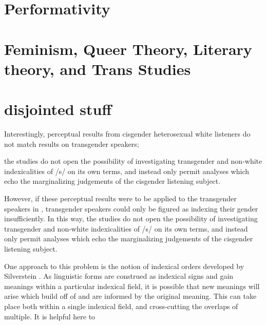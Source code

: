    	\section{Performativity}
   	\section{Feminism, Queer Theory, Literary theory, and Trans Studies}





\section{disjointed stuff}
	
	 Interestingly, perceptual results from cisgender heterosexual white listeners do not match results on transgender speakers; \textcite{jessee_}

	the studies do not open the possibility of investigating transgender and non-white indexicalities of /s/ on its own terms, and instead only permit analyses which echo the marginalizing judgements of the cisgender listening subject.
 

However, if these perceptual results were to be applied to the transgender speakers in \textcite{podesva_sexuality_2015, hazenberg_language_2012}, transgender speakers could only be figured as indexing their gender  insufficiently. In this way, the studies do not open the possibility of investigating transgender and non-white indexicalities of /s/ on its own terms, and instead only permit analyses which echo the marginalizing judgements of the cisgender listening subject. 

	 
	 
	 
	 One approach to this problem is the notion of indexical orders developed by  Silverstein \parencite*{silverstein_language_2023, silverstein_indexical_2003}. As linguistic forms are construed as indexical signs and gain meanings within a particular indexical field, it is possible that new meanings will arise which build off of and are informed by the original meaning. This can take place both within a single indexical field, and cross-cutting the overlaps of multiple. It is helpful here to 

